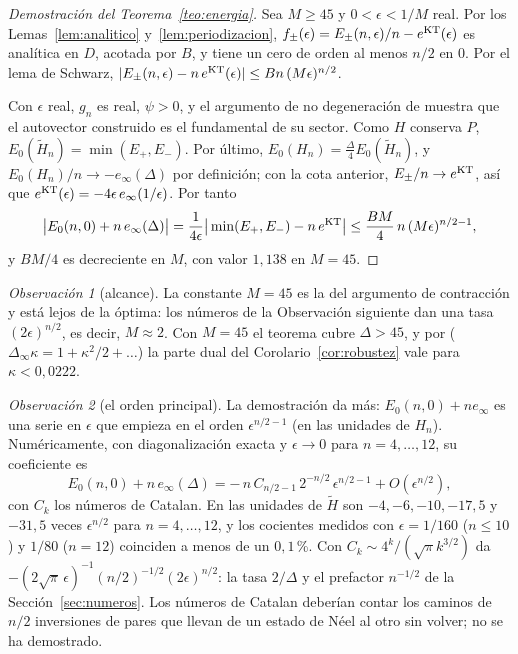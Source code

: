\documentclass[11pt,a4paper]{article}
\theoremstyle{remark}
\newtheorem*{observacion}{Observación}
\begin{document}
\begin{proof}[Demostración del Teorema~\ref{teo:energia}]
Sea $M\ge45$ y $0<\epsilon<1/M$ real. Por los Lemas~\ref{lem:analitico} y~\ref{lem:periodizacion},
$f_\pm(\epsilon)=E_\pm(n,\epsilon)/n-e^{\rm KT}(\epsilon)$ es analítica en $D$, acotada por $B$, y
tiene un cero de orden al menos $n/2$ en $0$. Por el lema de Schwarz,
$|E_\pm(n,\epsilon)-n\,e^{\rm KT}(\epsilon)|\le Bn\,(M\epsilon)^{n/2}$.

Con $\epsilon$ real, $g_n$ es real, $\psi>0$, y el argumento de no degeneración de \cite[Sec.~2]{dk-kink}
muestra que el autovector construido es el fundamental de su sector. Como $H$ conserva $P$,
$E_0(\widetilde H_n)=\min(E_+,E_-)$. Por último, $E_0(H_n)=\tfrac\Delta4E_0(\widetilde H_n)$, y
$E_0(H_n)/n\to-e_\infty(\Delta)$ por definición; con la cota anterior, $E_\pm/n\to e^{\rm KT}$, así que
$e^{\rm KT}(\epsilon)=-4\epsilon\,e_\infty(1/\epsilon)$. Por tanto
\[
  \big|E_0(n,0)+n\,e_\infty(\Delta)\big|=\frac1{4\epsilon}\big|\min(E_+,E_-)-n\,e^{\rm KT}\big|
  \le\frac{BM}4\,n\,(M\epsilon)^{n/2-1},
\]
y $BM/4$ es decreciente en $M$, con valor $1{,}138$ en $M=45$.
\end{proof}

\begin{observacion}[alcance]
La constante $M=45$ es la del argumento de contracción y está lejos de la óptima: los números de la
Observación siguiente dan una tasa $(2\epsilon)^{n/2}$, es decir, $M\approx2$. Con $M=45$ el teorema
cubre $\Delta>45$, y por \cite[Prop.~17(vi)]{robustez} ($\Delta_\infty\kappa=1+\kappa^2/2+\dots$) la
parte dual del Corolario~\ref{cor:robustez} vale para $\kappa<0{,}0222$.
\end{observacion}

\begin{observacion}[el orden principal]
La demostración da más: $E_0(n,0)+n e_\infty$ es una serie en $\epsilon$ que empieza en el orden
$\epsilon^{n/2-1}$ (en las unidades de $H_n$). Numéricamente, con diagonalización exacta y
$\epsilon\to0$ para $n=4,\dots,12$, su coeficiente es
\[
  E_0(n,0)+n\,e_\infty(\Delta)=-\,n\,C_{n/2-1}\,2^{-n/2}\,\epsilon^{n/2-1}+O(\epsilon^{n/2}),
\]
con $C_k$ los números de Catalan. En las unidades de $\widetilde H$ son $-4,-6,-10,-17{,}5$ y
$-31{,}5$ veces $\epsilon^{n/2}$ para $n=4,\dots,12$, y los cocientes medidos con $\epsilon=1/160$
($n\le10$) y $1/80$ ($n=12$) coinciden a menos de un $0{,}1$\,\%. Con
$C_k\sim4^k/(\sqrt\pi k^{3/2})$ da $-(2\sqrt\pi\,\epsilon)^{-1}(n/2)^{-1/2}(2\epsilon)^{n/2}$: la
tasa $2/\Delta$ y el prefactor $n^{-1/2}$ de la Sección~\ref{sec:numeros}. Los números de Catalan
deberían contar los caminos de $n/2$ inversiones de pares que llevan de un estado de Néel al otro sin
volver; no se ha demostrado.
\end{observacion}
\end{document}
